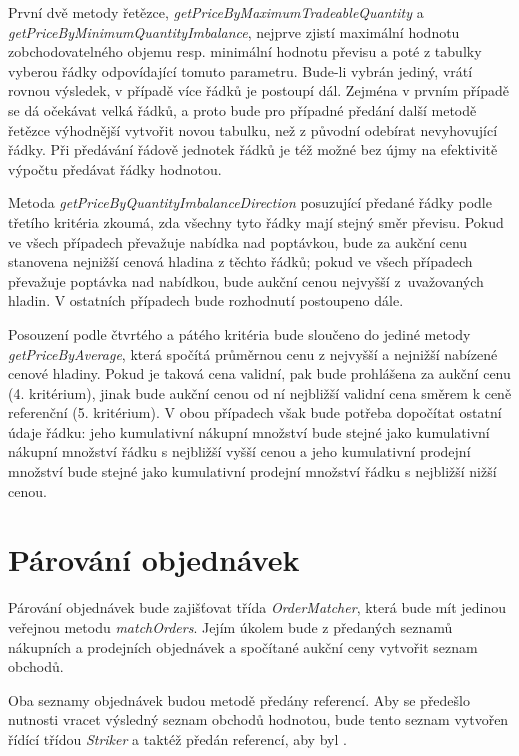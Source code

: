 \documentclass[thesis=M,czech]{FITthesis}[2012/06/26]
\begin{document}
První dvě metody řetězce, \textit{getPriceByMaximumTradeableQuantity} a \textit{getPriceByMinimumQuantityImbalance}, 
nejprve zjistí maximální hodnotu zobchodovatelného objemu resp. minimální hodnotu převisu a poté z tabulky vyberou řádky 
odpovídající tomuto parametru. Bude-li vybrán jediný, vrátí rovnou výsledek, v případě více řádků je postoupí dál. Zejména v prvním
případě se dá očekávat velká  řádků, a proto bude pro případné předání další metodě řetězce výhodnější vytvořit novou 
tabulku, než z původní odebírat nevyhovující řádky. Při předávání řádově jednotek řádků je též možné bez újmy na efektivitě 
výpočtu předávat řádky hodnotou.

Metoda \textit{getPriceByQuantityImbalanceDirection} posuzující předané řádky podle třetího kritéria zkoumá, zda všechny tyto 
řádky mají stejný směr převisu. Pokud ve všech případech převažuje nabídka nad poptávkou, bude za aukční cenu stanovena 
nejnižší cenová hladina z těchto řádků; pokud ve všech případech převažuje poptávka nad nabídkou, bude aukční cenou nejvyšší 
z~uvažovaných hladin. V ostatních případech bude rozhodnutí postoupeno dále.

Posouzení podle čtvrtého a pátého kritéria bude sloučeno do jediné metody \textit{getPriceByAverage}, která spočítá průměrnou 
cenu z nejvyšší a nejnižší nabízené cenové hladiny. Pokud je taková cena validní, pak bude prohlášena za aukční cenu (4. kritérium), 
jinak bude aukční cenou od ní nejbližší validní cena směrem k ceně referenční (5. kritérium). V obou případech však bude potřeba 
dopočítat ostatní údaje řádku: jeho kumulativní nákupní množství bude stejné jako kumulativní nákupní množství řádku s nejbližší 
vyšší cenou a jeho kumulativní prodejní množství bude stejné jako kumulativní prodejní množství řádku s nejbližší nižší cenou.



\section{Párování objednávek}

Párování objednávek bude zajišťovat třída \textit{OrderMatcher}, která bude mít jedinou veřejnou metodu \textit{matchOrders}. 
Jejím úkolem bude z předaných seznamů nákupních a prodejních objednávek a spočítané aukční ceny vytvořit seznam obchodů. 

Oba seznamy objednávek budou metodě předány referencí. Aby se předešlo nutnosti vracet výsledný seznam obchodů hodnotou, 
bude tento seznam vytvořen řídící třídou \textit{Striker} a taktéž předán referencí, aby byl .
\end{document}
